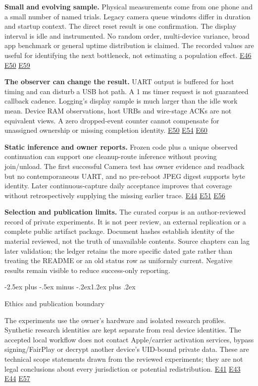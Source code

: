 \documentclass[10pt,letterpaper,twocolumn]{article}
\makeatletter
\renewcommand{\section}{\@startsection{section}{1}{0pt}
  {-2.5ex plus -.5ex minus -.2ex}{1.2ex plus .2ex}
  {\normalfont\large\bfseries\raggedright}}
\makeatother
\begin{document}
\textbf{Small and evolving sample.} Physical measurements come from one phone and a small number of named trials. Legacy camera queue windows differ in duration and startup context. The direct reset result is one confirmation. The display interval is idle and instrumented. No random order, multi-device variance, broad app benchmark or general uptime distribution is claimed. The recorded values are useful for identifying the next bottleneck, not estimating a population effect. \hyperlink{e-E46}{\textsf{E46}} \hyperlink{e-E50}{\textsf{E50}} \hyperlink{e-E59}{\textsf{E59}}

\textbf{The observer can change the result.} UART output is buffered for host timing and can disturb a USB hot path. A 1 ms timer request is not guaranteed callback cadence. Logging's display sample is much larger than the idle work mean. Device RAM observations, host URBs and wire-stage ACKs are not equivalent views. A zero dropped-event counter cannot compensate for unassigned ownership or missing completion identity. \hyperlink{e-E50}{\textsf{E50}} \hyperlink{e-E54}{\textsf{E54}} \hyperlink{e-E60}{\textsf{E60}}

\textbf{Static inference and owner reports.} Frozen code plus a unique observed continuation can support one cleanup-route inference without proving join/unload. The first successful Camera test has owner evidence and readback but no contemporaneous UART, and no pre-reboot JPEG digest supports byte identity. Later continuous-capture daily acceptance improves that coverage without retrospectively supplying the missing earlier trace. \hyperlink{e-E44}{\textsf{E44}} \hyperlink{e-E51}{\textsf{E51}} \hyperlink{e-E56}{\textsf{E56}}

\textbf{Selection and publication limits.} The curated corpus is an author-reviewed record of private experiments. It is not peer review, an external replication or a complete public artifact package. Document hashes establish identity of the material reviewed, not the truth of unavailable contents. Source chapters can lag later validation; the ledger retains the more specific dated gate rather than treating the README or an old status row as uniformly current. Negative results remain visible to reduce success-only reporting.

\section{Ethics and publication boundary}

The experiments use the owner's hardware and isolated research profiles. Synthetic research identities are kept separate from real device identities. The accepted local workflow does not contact Apple/carrier activation services, bypass signing/FairPlay or decrypt another device's UID-bound private data. These are technical scope statements drawn from the reviewed experiments; they are not legal conclusions about every jurisdiction or potential redistribution. \hyperlink{e-E41}{\textsf{E41}} \hyperlink{e-E43}{\textsf{E43}} \hyperlink{e-E44}{\textsf{E44}} \hyperlink{e-E57}{\textsf{E57}}
\end{document}
